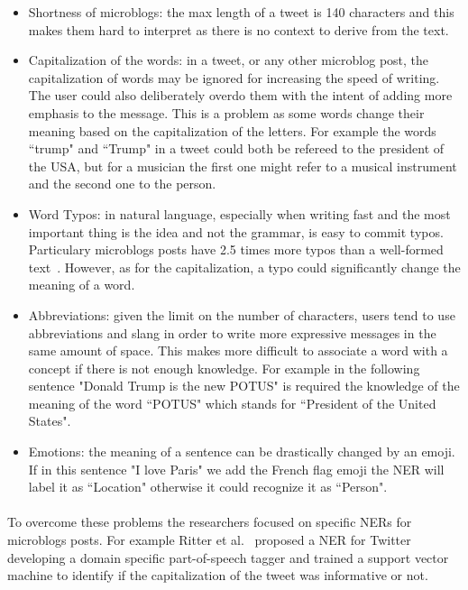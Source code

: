 \begin{itemize}[itemsep = 0.1em]
\item Shortness of microblogs: the max length of a tweet is 140 characters and this makes them hard to interpret as there is no context to derive from the text.

\item Capitalization of the words: in a tweet, or any other microblog post, the capitalization of words may be ignored for increasing the speed of writing. The user could also deliberately overdo them with the intent of adding more emphasis to the message. This is a problem as some words change their meaning based on the capitalization of the letters. For example the words ``trump" and ``Trump" in a tweet could both be refereed to the president of the USA, but for a musician the first one might refer to a musical instrument and the second one to the person.

\item Word Typos: in natural language, especially when writing fast and the most important thing is the idea and not the grammar, is easy to commit typos. Particulary microblogs posts have 2.5 times more typos than a well-formed text~\cite{derczynski2015analysis}. However, as for the capitalization, a typo could significantly change the meaning of a word.

\item Abbreviations: given the limit on the number of characters, users tend to use abbreviations and slang in order to write more expressive messages in the same amount of space. This makes more difficult to associate a word with a concept if there is not enough knowledge. For example in the following sentence "Donald Trump is the new POTUS" is required the knowledge of the meaning of the word ``POTUS" which stands for ``President of the United States".

\item Emotions: the meaning of a sentence can be drastically changed by an emoji. If in this sentence "I love Paris" we add the French flag emoji the NER will label it as ``Location" otherwise it could recognize it as ``Person".
\end{itemize}

\paragraph{}
To overcome these problems the researchers focused on specific NERs for microblogs posts. For example Ritter et al.~\cite{ritter2011named} proposed a NER for Twitter developing a domain specific part-of-speech tagger and trained a support vector machine to identify if the capitalization of the tweet was informative or not. 


